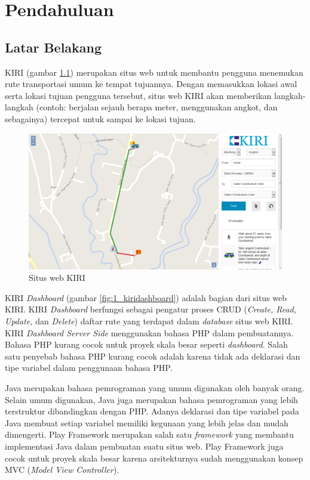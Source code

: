 \chapter{Pendahuluan}
\label{chap:pendahuluan}

\section{Latar Belakang}
\label{sec:latar_belakang}
KIRI\cite{kiritravel} (gambar \ref{fig:1_kiritravel}) merupakan situs web untuk membantu pengguna menemukan rute transportasi umum ke tempat tujuannya. Dengan memasukkan lokasi awal serta lokasi tujuan pengguna tersebut, situs web KIRI akan memberikan langkah-langkah (contoh: berjalan sejauh berapa meter, menggunakan angkot, dan sebagainya) tercepat untuk sampai ke lokasi tujuan.

\begin{figure}[htbp]
	\centering
		\includegraphics[scale=0.35]{Gambar/1_kiritravel.png}
	\caption{Situs web KIRI\cite{kiritravel}}
	\label{fig:1_kiritravel}
\end{figure}

KIRI \textit{Dashboard}\cite{devkiritravel} (gambar \ref{fig:1_kiridashboard}) adalah bagian dari situs web KIRI. KIRI \textit{Dashboard} berfungsi sebagai pengatur proses CRUD (\textit{Create, Read, Update,} dan \textit{Delete}) daftar rute yang terdapat dalam \textit{database} situs web KIRI. KIRI \textit{Dashboard Server Side} menggunakan bahasa PHP dalam pembuatannya\cite{kiridashboard}. Bahasa PHP kurang cocok untuk proyek skala besar seperti \textit{dashboard}. Salah satu penyebab bahasa PHP kurang cocok adalah karena tidak ada deklarasi dan tipe variabel dalam penggunaan bahasa PHP.

Java merupakan bahasa pemrograman yang umum digunakan oleh banyak orang. Selain umum digunakan, Java juga merupakan bahasa pemrograman yang lebih terstruktur dibandingkan dengan PHP. Adanya deklarasi dan tipe variabel pada Java membuat setiap variabel memiliki kegunaan yang lebih jelas dan mudah dimengerti. Play Framework merupakan salah satu \textit{framework} yang membantu implementasi Java dalam pembuatan suatu situs web. Play Framework juga cocok untuk proyek skala besar karena arsitekturnya sudah menggunakan konsep MVC (\textit{Model View Controller})\cite{playforjava}.

